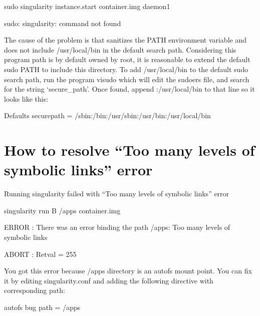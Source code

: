 \documentclass[letterpaper,10pt,english]{sphinxmanual}
\begin{document}
%
\begin{sphinxVerbatim}[commandchars=\\\{\}]
\PYGZdl{} sudo singularity instance.start container.img daemon1

sudo: singularity: command not found
\end{sphinxVerbatim}

The cause of the problem is that  sanitizes the PATH environment
variable and does not include /usr/local/bin in the default search
path. Considering this program path is by default owned by root, it is
reasonable to extend the default sudo PATH to include this directory.
To add /usr/local/bin to the default sudo search path, run the program
visudo which will edit the sudoers file, and search for the string
‘secure\_path’. Once found, append :/usr/local/bin to that line so it
looks like this:

%
\begin{sphinxVerbatim}[commandchars=\\\{\}]
Defaults    secure\PYGZus{}path = /sbin:/bin:/usr/sbin:/usr/bin:/usr/local/bin
\end{sphinxVerbatim}


\section{How to resolve “Too many levels of symbolic links” error}
\label{\detokenize{troubleshooting:how-to-resolve-too-many-levels-of-symbolic-links-error}}
Running singularity failed with “Too many levels of symbolic links”
error

%
\begin{sphinxVerbatim}[commandchars=\\\{\}]
\PYGZdl{} singularity run \PYGZhy{}B /apps container.img

ERROR : There was an error binding the path /apps: Too many levels of symbolic links

ABORT : Retval = 255
\end{sphinxVerbatim}

You got this error because /apps directory is an autofs mount point. You
can fix it by editing singularity.conf and adding the following
directive with corresponding path:

%
\begin{sphinxVerbatim}[commandchars=\\\{\}]
autofs bug path = /apps
\end{sphinxVerbatim}
\end{document}
